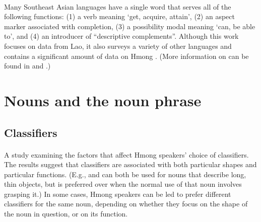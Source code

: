 \documentclass[11pt,DIV=12]{scrartcl}
\newenvironment{commoncore}%
	{\hspace*{2.5em}\begin{minipage}{\dimexpr\linewidth-2.5em}%
		\KOMAoptions{parskip=half}%
		}
	{\end{minipage}}
\newenvironment{entry}[1]%
	{\paragraph{\citetitle{#1}}%
		\label{#1}%
		\parencite{#1}%
		\par\begin{commoncore}%
		}
	{\par\end{commoncore}}%
\newcommand{\rlink}[1]{\hyperref[#1]{\citealt{#1}}}%
\begin{document}
\begin{entry}{Enfield2003}
Many Southeast Asian languages have a single word that serves all of the following functions: (1) a verb meaning `get, acquire, attain', (2) an aspect marker associated with completion, (3) a possibility modal meaning `can, be able to', and (4) an introducer of ``descriptive complements''. Although this work focuses on data from Lao, it also surveys a variety of other languages and contains a significant amount of data on Hmong . (More information on  can be found in \rlink{Li1991} and \rlink{Jarkey2015}.)	
\end{entry}



\section{Nouns and the noun phrase}

\subsection{Classifiers}

\begin{entry}{SakuragiFuller2013}
{A study examining the factors that affect Hmong speakers' choice of classifiers. The results suggest that classifiers are associated with both particular shapes and particular functions. (E.g.,  and  can both be used for nouns that describe long, thin objects, but  is preferred over  when the normal use of that noun involves grasping it.) In some cases, Hmong speakers can be led to prefer different classifiers for the same noun, depending on whether they focus on the shape of the noun in question, or on its function.} 
\end{entry}
\end{document}

